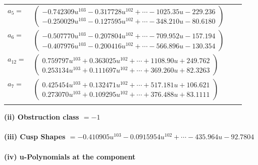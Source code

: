 \documentclass[1p]{elsarticle_modified}
\theoremstyle{definition}
\begin{document}
\begin{tabular}{m{7pt} m{180pt} m{7pt} m{180pt} }
\flushright $a_{5}=$&$\begin{pmatrix}-0.742309 u^{103}-0.317728 u^{102}+\cdots-1025.35 u-229.236\\-0.250029 u^{103}-0.127595 u^{102}+\cdots-348.210 u-80.6180\end{pmatrix}$ \\
\flushright $a_{6}=$&$\begin{pmatrix}-0.507770 u^{103}-0.207804 u^{102}+\cdots-709.952 u-157.194\\-0.407976 u^{103}-0.200416 u^{102}+\cdots-566.896 u-130.354\end{pmatrix}$ \\
\flushright $a_{12}=$&$\begin{pmatrix}0.759797 u^{103}+0.363025 u^{102}+\cdots+1108.90 u+249.762\\0.253134 u^{103}+0.111697 u^{102}+\cdots+369.260 u+82.3263\end{pmatrix}$ \\
\flushright $a_{7}=$&$\begin{pmatrix}0.425454 u^{103}+0.132471 u^{102}+\cdots+517.181 u+106.621\\0.273070 u^{103}+0.109295 u^{102}+\cdots+376.488 u+83.1111\end{pmatrix}$\\&\end{tabular}
\flushleft \textbf{(ii) Obstruction class $= -1$}\\~\\
\flushleft \textbf{(iii) Cusp Shapes $= -0.410905 u^{103}-0.0915954 u^{102}+\cdots-435.964 u-92.7804$}\\~\\
\newpage\renewcommand{\arraystretch}{1}
\flushleft \textbf{(iv) u-Polynomials at the component}\newline \\
\end{document}
